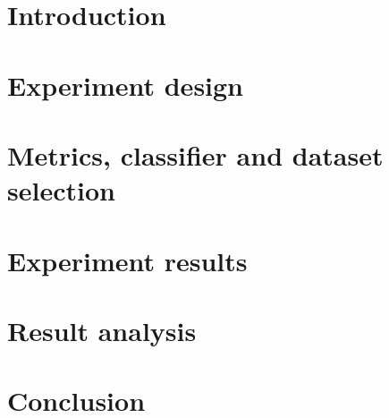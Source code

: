 \documentclass[a4paper,11pt,pdftex,halfparskip,cleardoubleempty]{scrbook}
\begin{document}

\pagestyle{plain} 



\section{Introduction}
\label{sec:introduction}


\section{Experiment design}
\label{sec:experiment}


\section{Metrics, classifier and dataset selection}
\label{sec:selection}




\section{Experiment results}
\label{sec:results}


\section{Result analysis}
\label{sec:testing}


\section{Conclusion}
\label{sec:conclusion}




\end{document}
